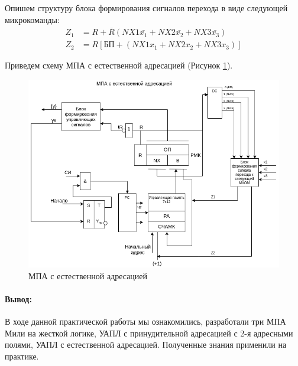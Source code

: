 \documentclass[a4paper,14pt]{extarticle}
\begin{document}
Опишем структуру блока формирования сигналов перехода в виде следующей
микрокоманды:
\begin{align*}
	Z_1 & =R + \bar{R}\left(NX1\bar{x_1}+NX2\bar{x_2}+NX3\bar{x_3}\right) \\
	Z_2 & = R\left[БП + \left(NX1x_1+NX2x_2+NX3x_3\right)\right]
\end{align*}

Приведем схему МПА с естественной адресацией (Рисунок \ref{fig:nature-scheme}).
\begin{figure}[htpb]
	\centering
	\includegraphics[width=0.8\linewidth]{images/nature-scheme}
	\caption{МПА с естественной адресацией}
	\label{fig:nature-scheme}
\end{figure}
	\paragraph{Вывод:}
	В ходе данной практической работы мы ознакомились, разработали три МПА Мили на жесткой логике, УАПЛ с принудительной адресацией с 2-я адресными полями, УАПЛ с естественной адресацией.
	Полученные знания применили на практике.
	
	
\end{document}
